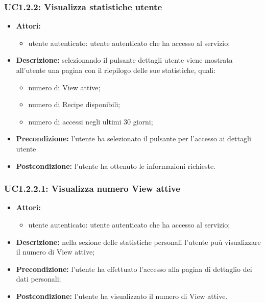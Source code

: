 \subsubsection{UC1.2.2: Visualizza statistiche utente}

\begin{itemize}
	\item \textbf{Attori:}
	\begin{itemize}
		\item utente autenticato: utente autenticato che ha accesso al servizio;
	\end{itemize}
	\item \textbf{Descrizione:} selezionando il pulsante dettagli utente viene mostrata all'utente una pagina con il riepilogo delle sue statistiche, quali:
	\begin{itemize}
		\item numero di View attive;
		\item numero di Recipe disponibili;
		\item numero di accessi negli ultimi 30 giorni;
	\end{itemize}
  \item \textbf{Precondizione:} l'utente ha selezionato il pulsante per l'accesso ai dettagli utente
	\item \textbf{Postcondizione:} l'utente ha ottenuto le informazioni richieste.
\end{itemize}

\subsubsection{UC1.2.2.1: Visualizza numero View attive}

\begin{itemize}
	\item \textbf{Attori:}
	\begin{itemize}
		\item utente autenticato: utente autenticato che ha accesso al servizio;
	\end{itemize}
	\item \textbf{Descrizione:} nella sezione delle statistiche personali l'utente puù visualizzare il numero di View attive;
	\item \textbf{Precondizione:} l'utente ha effettuato l'accesso alla pagina di dettaglio dei dati personali;
	\item \textbf{Postcondizione:} l'utente ha visualizzato il numero di View attive.
\end{itemize}


